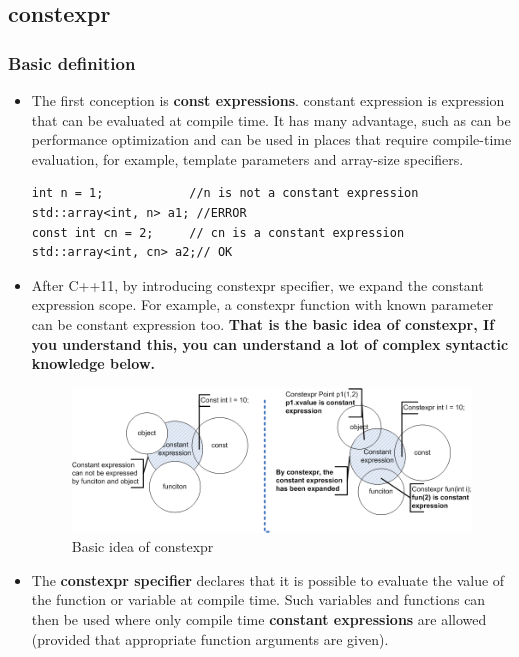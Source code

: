 \documentclass[a4paper,11pt,twoside]{book}
\begin{document}
\subsection{constexpr}

\subsubsection{Basic definition}
\begin{itemize}
	\item The first conception is \textbf{const expressions}. constant expression is expression that can be evaluated at compile time. It has many advantage, such as can be performance optimization and can be used in places that require compile-time evaluation, for example, template parameters and array-size specifiers.
\begin{lstlisting}
int n = 1;            //n is not a constant expression
std::array<int, n> a1; //ERROR 
const int cn = 2;     // cn is a constant expression
std::array<int, cn> a2;// OK 
\end{lstlisting}

	\item After C++11, by introducing constexpr specifier, we expand the constant expression scope. For example, a constexpr function with known parameter can be constant expression too. \textbf{That is the basic idea of constexpr, If you understand this, you can understand a lot of complex syntactic knowledge below.}
	\begin{figure}[h]
		\centering
		\includegraphics[width=0.9\linewidth]{pics/constexpr.png}
		\caption{Basic idea of constexpr}
		\label{fig:constexpr}
	\end{figure}
	
	\item The \textbf{constexpr specifier} declares that it is possible to evaluate the value of the function or variable at compile time. Such variables and functions can then be used where only compile time \textbf{constant expressions} are allowed (provided that appropriate function arguments are given). 


\end{itemize}
\end{document}
